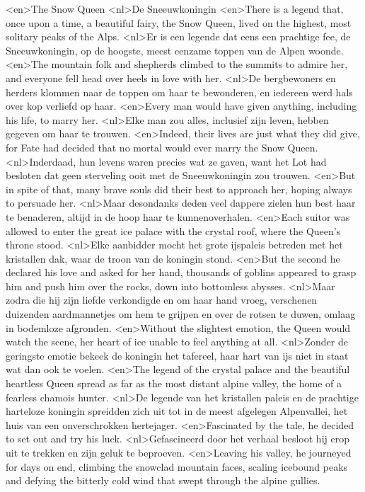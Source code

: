 <en>The Snow Queen
<nl>De Sneeuwkoningin
<en>There is a legend that, once upon a time, a beautiful fairy, the Snow Queen, lived on the highest, most solitary peaks of the Alps.
<nl>Er is een legende dat eens een prachtige fee, de Sneeuwkoningin, op de hoogste, meest eenzame toppen van de Alpen woonde.
<en>The mountain folk and shepherds climbed to the summits to admire her, and everyone fell head over heels in love with her.
<nl>De bergbewoners en herders klommen naar de toppen om haar te bewonderen, en iedereen werd hals over kop verliefd op haar.
<en>Every man would have given anything, including his life, to marry her.
<nl>Elke man zou alles, inclusief zijn leven, hebben gegeven om haar te trouwen.
<en>Indeed, their lives are just what they did give, for Fate had decided that no mortal would ever marry the Snow Queen.
<nl>Inderdaad, hun levens waren precies wat ze gaven, want het Lot had besloten dat geen sterveling ooit met de Sneeuwkoningin zou trouwen.
<en>But in spite of that, many brave souls did their best to approach her, hoping always to persuade her.
<nl>Maar desondanks deden veel dappere zielen hun best haar te benaderen, altijd in de hoop haar te kunnenoverhalen.
<en>Each suitor was allowed to enter the great ice palace with the crystal roof, where the Queen’s throne stood.
<nl>Elke aanbidder mocht het grote ijspaleis betreden met het kristallen dak, waar de troon van de koningin stond.
<en>But the second he declared his love and asked for her hand, thousands of goblins appeared to grasp him and push him over the rocks, down into bottomless abysses.
<nl>Maar zodra die hij zijn liefde verkondigde en om haar hand vroeg, verschenen duizenden aardmannetjes om hem te grijpen en over de rotsen te duwen, omlaag in bodemloze afgronden.
<en>Without the slightest emotion, the Queen would watch the scene, her heart of ice unable to feel anything at all.
<nl>Zonder de geringste emotie bekeek de koningin het tafereel, haar hart van ijs niet in staat wat dan ook te voelen.
<en>The legend of the crystal palace and the beautiful heartless Queen spread as far as the most distant alpine valley, the home of a fearless chamois hunter.
<nl>De legende van het kristallen paleis en de prachtige harteloze koningin spreidden zich uit tot in de meest afgelegen Alpenvallei, het huis van een onverschrokken hertejager.
<en>Fascinated by the tale, he decided to set out and try his luck.
<nl>Gefascineerd door het verhaal besloot hij erop uit te trekken en zijn geluk te beproeven.
<en>Leaving his valley, he journeyed for days on end, climbing the snowclad mountain faces, scaling icebound peaks and defying the bitterly cold wind that swept through the alpine gullies.
